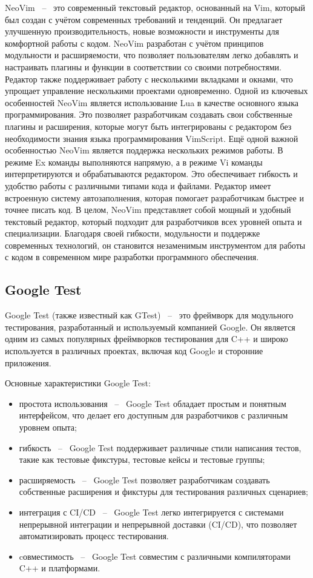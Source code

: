 NeoVim ~--~ это современный текстовый редактор, основанный на Vim, который был создан с учётом современных требований и тенденций. Он предлагает улучшенную производительность, новые возможности и инструменты для комфортной работы с кодом.
NeoVim разработан с учётом принципов модульности и расширяемости, что позволяет пользователям легко добавлять и настраивать плагины и функции в соответствии со своими потребностями. Редактор также поддерживает работу с несколькими вкладками и окнами, что упрощает управление несколькими проектами одновременно.
Одной из ключевых особенностей NeoVim является использование Lua в качестве основного языка программирования. Это позволяет разработчикам создавать свои собственные плагины и расширения, которые могут быть интегрированы с редактором без необходимости знания языка программирования VimScript.
Ещё одной важной особенностью NeoVim является поддержка нескольких режимов работы. В режиме Ex команды выполняются напрямую, а в режиме Vi команды интерпретируются и обрабатываются редактором. Это обеспечивает гибкость и удобство работы с различными типами кода и файлами.
Редактор имеет встроенную систему автозаполнения, которая помогает разработчикам быстрее и точнее писать код.
В целом, NeoVim представляет собой мощный и удобный текстовый редактор, который подходит для разработчиков всех уровней опыта и специализации. Благодаря своей гибкости, модульности и поддержке современных технологий, он становится незаменимым инструментом для работы с кодом в современном мире разработки программного обеспечения.

\subsection{Google Test}
Google Test (также известный как GTest) ~--~ это фреймворк для модульного тестирования, разработанный и используемый компанией Google\cite{how_google_tests_software}. Он является одним из самых популярных фреймворков тестирования для C++ и широко используется в различных проектах, включая код Google и сторонние приложения.

Основные характеристики Google Test:
\begin{itemize}
    \item простота использования ~--~ Google Test обладает простым и понятным интерфейсом, что делает его доступным для разработчиков с различным уровнем опыта;
    \item гибкость ~--~ Google Test поддерживает различные стили написания тестов, такие как тестовые фикстуры, тестовые кейсы и тестовые группы;
    \item расширяемость ~--~ Google Test позволяет разработчикам создавать собственные расширения и фикстуры для тестирования различных сценариев;
    \item интеграция с CI/CD ~--~ Google Test легко интегрируется с системами непрерывной интеграции и непрерывной доставки (CI/CD), что позволяет автоматизировать процесс тестирования.
    \item cовместимость ~--~ Google Test совместим с различными компиляторами C++ и платформами.
\end{itemize}

